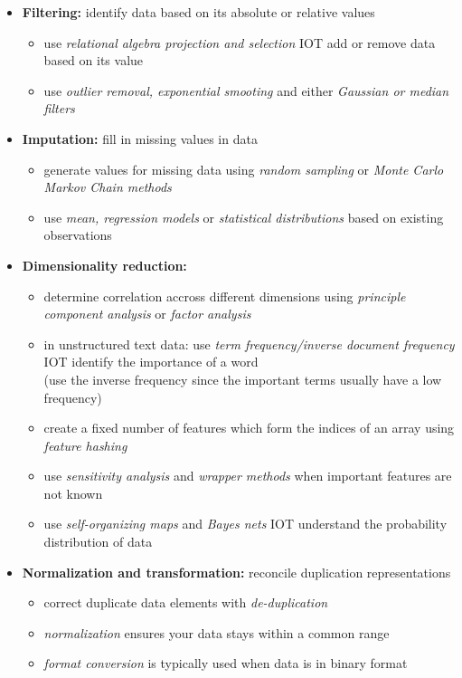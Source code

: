 \documentclass[a4paper, landscape, 6pt, fleqn]{scrartcl}
\renewcommand{\emph}[1]{\textbf{#1}}
\begin{document}
\begin{multicols*}{4}
\begin{itemize}
\item \emph{Filtering:} identify data based on its absolute or relative values
\begin{itemize}
\item use \textit{relational algebra projection and selection} IOT add or remove data based on its value
\item use \textit{outlier removal, exponential smooting} and either \textit{Gaussian or median filters}
\end{itemize}
\item \emph{Imputation:} fill in missing values in data
\begin{itemize}
\item generate values for missing data using \textit{random sampling} or \textit{Monte Carlo Markov Chain methods}
\item use \textit{mean, regression models} or \textit{statistical distributions} based on existing observations
\end{itemize}
\item \emph{Dimensionality reduction:}
\begin{itemize}
\item determine correlation accross different dimensions using \textit{principle component analysis} or \textit{factor analysis}
\item in unstructured text data: use \textit{term frequency/inverse document frequency} IOT identify the importance of a word \\
(use the inverse frequency since the important terms usually have a low frequency)
\item create a fixed number of features which form the indices of an array using \textit{feature hashing}
\item use \textit{sensitivity analysis} and \textit{wrapper methods} when important features are not known
\item use \textit{self-organizing maps} and \textit{Bayes nets} IOT understand the probability distribution of data
\end{itemize}
\item \emph{Normalization and transformation:} reconcile duplication representations
\begin{itemize}
\item correct duplicate data elements with \textit{de-duplication}
\item \textit{normalization} ensures your data stays within a common range
\item \textit{format conversion} is typically used when data is in binary format

\end{itemize}
\end{itemize}
\end{multicols*}
\end{document}
